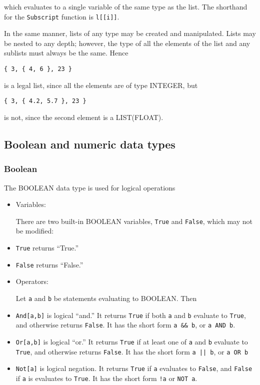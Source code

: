 \noindent which evaluates to a single variable of the same type as the list.
The shorthand for the \verb+Subscript+ function is \verb+l[[i]]+.

In the same manner, lists of any type may be created and manipulated.
Lists may be nested to any depth; however, the type of all the elements
of the list and any sublists must always be the same.  Hence

\begin{verbatim}
{ 3, { 4, 6 }, 23 }
\end{verbatim}

is a legal list, since all the elements are of type INTEGER, but

\begin{verbatim}
{ 3, { 4.2, 5.7 }, 23 }
\end{verbatim}

is not, since the second element is a LIST(FLOAT).

\subsection{Boolean and numeric data types}

\subsubsection{Boolean}

The BOOLEAN data type is used for logical operations

\begin{itemize}
\item
Variables:

There are two built-in BOOLEAN variables, \verb+True+  and \verb+False+, which
may not be modified: 

\bd
\item
\verb+True+ returns ``True.''

\item
\verb+False+ returns ``False.''
\ed

\item
Operators:

Let \verb+a+ and \verb+b+ be statements evaluating to BOOLEAN. Then  

\bd
\item
\verb+And[a,b]+ is logical ``and.''  It returns \verb+True+ if
both \verb+a+ and \verb+b+ evaluate to \verb+True+, and otherwise
returns \verb+False+.  It has the short form \verb+a && b+, or
\verb+a AND b+. 

\item
\verb+Or[a,b]+ is logical ``or.''  It returns \verb+True+ if
at least one of \verb+a+ and \verb+b+ evaluate to \verb+True+, and otherwise
returns \verb+False+. It has the short form \verb+a || b+, 
or \verb+a OR b+

\item
\verb+Not[a]+ is logical negation.  It returns \verb+True+ if \verb+a+
evaluates to \verb+False+, and \verb+False+ if \verb+a+ is evaluates
to \verb+True+.  It has the short form \verb+!a+ or \verb+NOT a+.
\ed 
\end{itemize}

